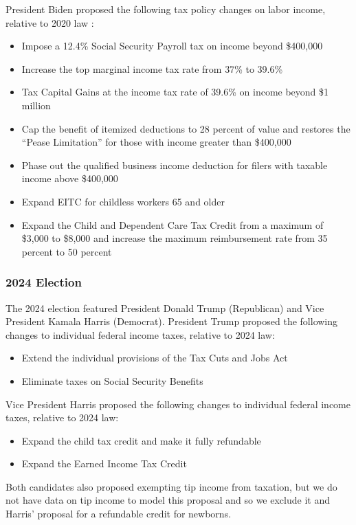 \documentclass[12pt]{article}
\begin{document}
President Biden proposed the following tax policy changes on labor income, relative to 2020 law \citep{Biden}:
\begin{itemize}
    \item Impose a 12.4\% Social Security Payroll tax on income beyond \$400,000
    \item Increase the top marginal income tax rate from 37\% to 39.6\%
    \item Tax Capital Gains at the income tax rate of 39.6\% on income beyond \$1 million
    \item Cap the benefit of itemized deductions to 28 percent of value and restores the ``Pease Limitation'' for those with income greater than \$400,000
    \item Phase out the qualified business income deduction for filers with taxable income above \$400,000
    \item Expand EITC for childless workers 65 and older
    \item Expand the Child and Dependent Care Tax Credit from a maximum of \$3,000 to \$8,000 and increase the maximum reimbursement rate from 35 percent to 50 percent
\end{itemize}

\subsubsection{2024 Election}

The 2024 election featured President Donald Trump (Republican) and Vice President Kamala Harris (Democrat).  President Trump proposed the following changes to individual federal income taxes, relative to 2024 law:
\begin{itemize}
    \item Extend the individual provisions of the Tax Cuts and Jobs Act
    \item Eliminate taxes on Social Security Benefits
\end{itemize}

Vice President Harris proposed the following changes to individual federal income taxes, relative to 2024 law:
\begin{itemize}
    \item Expand the child tax credit and make it fully refundable
    \item Expand the Earned Income Tax Credit
\end{itemize}

Both candidates also proposed exempting tip income from taxation, but we do not have data on tip income to model this proposal and so we exclude it and Harris' proposal for a refundable credit for newborns.
\end{document}
